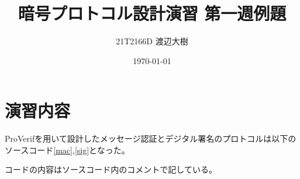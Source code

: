 \documentclass[a4paper,11pt]{jsarticle}
\begin{document}
\title{暗号プロトコル設計演習 第一週例題}
\author{21T2166D 渡辺大樹}
\date{\today}
\maketitle

\section*{演習内容}
ProVerifを用いて設計したメッセージ認証とデジタル署名のプロトコルは以下のソースコード\ref{mac},\ref{sig}となった。
 


コードの内容はソースコード内のコメントで記している。
\end{document}
